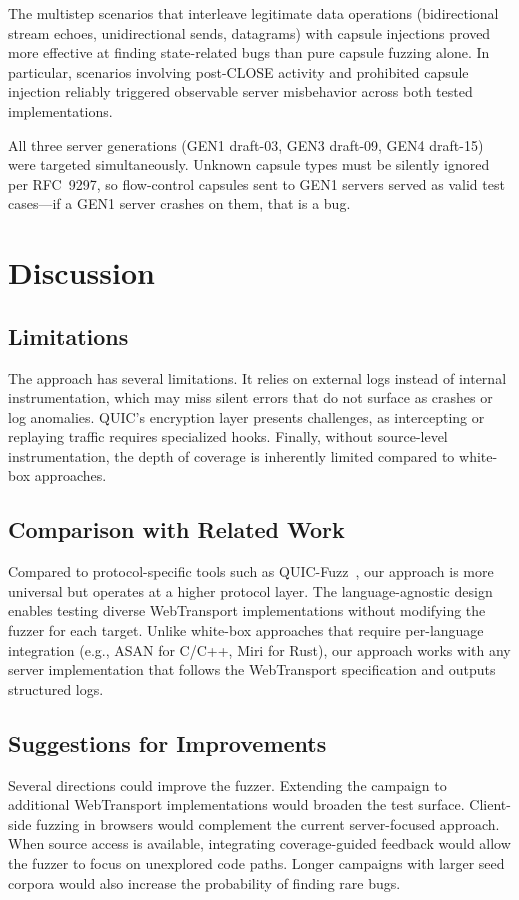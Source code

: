 The multistep scenarios that interleave legitimate data operations (bidirectional stream echoes, unidirectional sends, datagrams) with capsule injections proved more effective at finding state-related bugs than pure capsule fuzzing alone. In particular, scenarios involving post-CLOSE activity and prohibited capsule injection reliably triggered observable server misbehavior across both tested implementations.

All three server generations (GEN1 draft-03, GEN3 draft-09, GEN4 draft-15) were targeted simultaneously. Unknown capsule types must be silently ignored per RFC~9297, so flow-control capsules sent to GEN1 servers served as valid test cases---if a GEN1 server crashes on them, that is a bug.

\section{Discussion}

\subsection{Limitations}

The approach has several limitations. It relies on external logs instead of internal instrumentation, which may miss silent errors that do not surface as crashes or log anomalies. QUIC's encryption layer presents challenges, as intercepting or replaying traffic requires specialized hooks. Finally, without source-level instrumentation, the depth of coverage is inherently limited compared to white-box approaches.

\subsection{Comparison with Related Work}

Compared to protocol-specific tools such as QUIC-Fuzz~\cite{li2024fuzzing}, our approach is more universal but operates at a higher protocol layer. The language-agnostic design enables testing diverse WebTransport implementations without modifying the fuzzer for each target. Unlike white-box approaches that require per-language integration (e.g., ASAN for C/C++, Miri for Rust), our approach works with any server implementation that follows the WebTransport specification and outputs structured logs.

\subsection{Suggestions for Improvements}

Several directions could improve the fuzzer. Extending the campaign to additional WebTransport implementations would broaden the test surface. Client-side fuzzing in browsers would complement the current server-focused approach. When source access is available, integrating coverage-guided feedback would allow the fuzzer to focus on unexplored code paths. Longer campaigns with larger seed corpora would also increase the probability of finding rare bugs.
